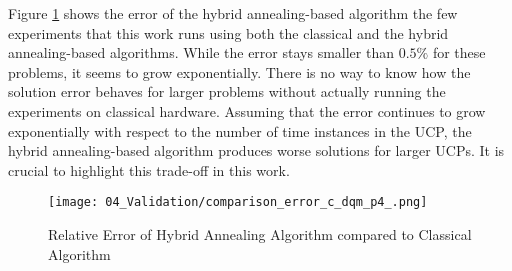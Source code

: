 Figure \ref{figure:validation.comparison.error} shows the error of the hybrid annealing-based algorithm the few experiments that this work runs using both the classical and the hybrid annealing-based algorithms.
While the error stays smaller than $0.5\%$ for these problems, it seems to grow exponentially.
There is no way to know how the solution error behaves for larger problems without actually running the experiments on classical hardware.
Assuming that the error continues to grow exponentially with respect to the number of time instances in the UCP, the hybrid annealing-based algorithm produces worse solutions for larger UCPs.
It is crucial to highlight this trade-off in this work.

\begin{figure}
  \centering
  \texttt{[image: 04\_Validation/comparison\_error\_c\_dqm\_p4\_.png]}
  \caption{Relative Error of Hybrid Annealing Algorithm compared to Classical Algorithm}
  \label{figure:validation.comparison.error}
\end{figure}

